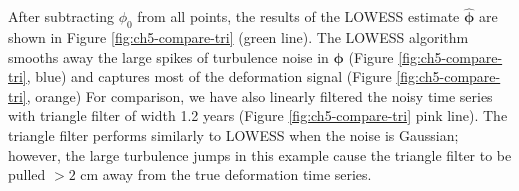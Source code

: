 After subtracting $ \phi_0 $ from all points, the results of the LOWESS estimate $ \bm{\hat{\phi}} $ are shown in Figure \ref{fig:ch5-compare-tri} (green line). The LOWESS algorithm smooths away the large spikes of turbulence noise in  $ \bm{\phi} $ (Figure \ref{fig:ch5-compare-tri}, blue) and captures most of the deformation signal (Figure \ref{fig:ch5-compare-tri}, orange)
For comparison, we have also linearly filtered the noisy time series with triangle filter of width 1.2 years (Figure \ref{fig:ch5-compare-tri} pink line). 
The triangle filter performs similarly to LOWESS when the noise is Gaussian; however, the large turbulence jumps in this example cause the triangle filter to be pulled $>2$ cm away from the true deformation time series.




%

